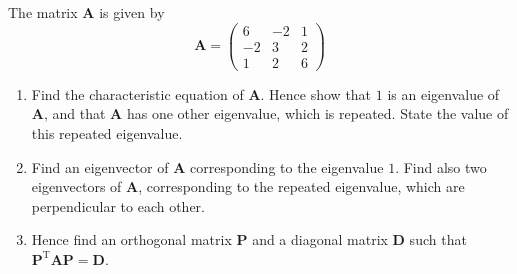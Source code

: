 \documentclass[leqno]{article}
\begin{document}
\begin{enumerate}[
  label=\textbf{\arabic*.},
  leftmargin=*,
  topsep=0pt,
  partopsep=0pt,
  parsep=0pt
]
\newpage

\questionitem

The matrix $\mathbf{A}$ is given by
\[\mathbf{A} = \begin{pmatrix} 6 & -2 & 1 \\ -2 & 3 & 2 \\ 1 & 2 & 6 \end{pmatrix}\]
\begin{enumerate}[label=\textbf{(\alph*)}]
  \item Find the characteristic equation of $\mathbf{A}$. Hence show that $1$ is an eigenvalue of $\mathbf{A}$, and that $\mathbf{A}$ has one other eigenvalue, which is repeated. State the value of this repeated eigenvalue.  \\
  \item Find an eigenvector of $\mathbf{A}$ corresponding to the eigenvalue $1$. Find also two eigenvectors of $\mathbf{A}$, corresponding to the repeated eigenvalue, which are perpendicular to each other.  \\
  \item Hence find an orthogonal matrix $\mathbf{P}$ and a diagonal matrix $\mathbf{D}$ such that $\mathbf{P}^{\mathrm{T}}\mathbf{A}\mathbf{P} = \mathbf{D}$.  \\
\end{enumerate}

\newpage

\questionitem


\end{enumerate}
\end{document}
